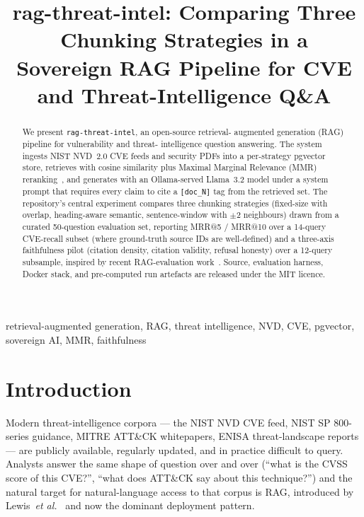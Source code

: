 \documentclass[conference]{IEEEtran}
\title{rag-threat-intel: Comparing Three Chunking Strategies in a\\Sovereign RAG Pipeline for CVE and Threat-Intelligence Q\&A}
\author{
\IEEEauthorblockN{Ali Murtaza Bhutto}
\IEEEauthorblockA{Independent Researcher\\
ORCID: 0009-0007-2787-943X\\
\href{https://github.com/thunderstornX/rag-threat-intel}{github.com/thunderstornX/rag-threat-intel}}
}
\begin{document}
\maketitle

\begin{abstract}
We present \texttt{rag-threat-intel}, an open-source retrieval-
augmented generation (RAG) pipeline for vulnerability and threat-
intelligence question answering. The system ingests NIST NVD~2.0
CVE feeds and security PDFs into a per-strategy pgvector store,
retrieves with cosine similarity plus Maximal Marginal Relevance
(MMR) reranking~\cite{carbonell1998mmr}, and generates with an
Ollama-served Llama~3.2 model under a system prompt that requires
every claim to cite a \texttt{[doc\_N]} tag from the retrieved set.
The repository's central experiment compares three chunking
strategies (fixed-size with overlap, heading-aware semantic,
sentence-window with $\pm$2 neighbours) drawn from a curated
50-question evaluation set, reporting MRR@5 / MRR@10
\cite{voorhees1999trec8qa} over a 14-query CVE-recall subset (where
ground-truth source IDs are well-defined) and a three-axis
faithfulness pilot (citation density, citation validity, refusal
honesty) over a 12-query subsample, inspired by recent RAG-evaluation
work~\cite{es2023ragas,iris2025chunking}. Source, evaluation
harness, Docker stack, and pre-computed run artefacts are released
under the MIT licence.
\end{abstract}

\begin{IEEEkeywords}
retrieval-augmented generation, RAG, threat intelligence, NVD, CVE,
pgvector, sovereign AI, MMR, faithfulness
\end{IEEEkeywords}

\section{Introduction}
\label{sec:intro}

Modern threat-intelligence corpora --- the NIST NVD CVE feed, NIST SP
800-series guidance, MITRE ATT\&CK whitepapers, ENISA threat-landscape
reports --- are publicly available, regularly updated, and in
practice difficult to query. Analysts answer the same shape of
question over and over (``what is the CVSS score of this CVE?'',
``what does ATT\&CK say about this technique?'') and the natural
target for natural-language access to that corpus is RAG,
introduced by Lewis~\textit{et al.}~\cite{lewis2020rag} and now the
dominant deployment pattern.
\end{document}
